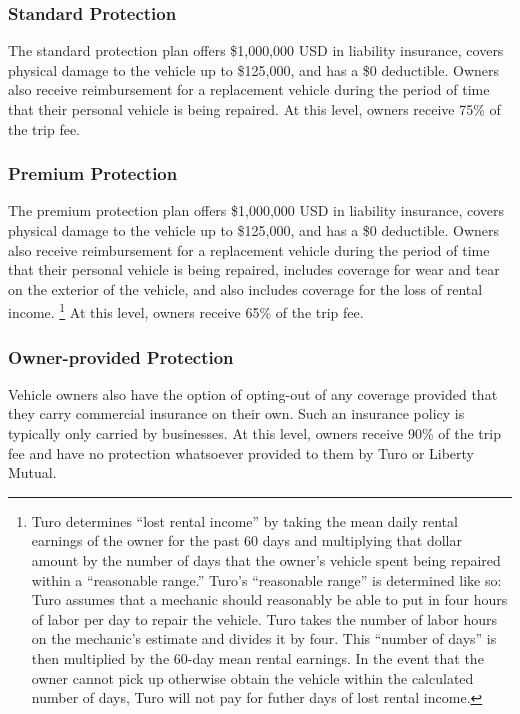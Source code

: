 \documentclass[review,12pt]{elsarticle}
\begin{document}
\subsubsection{Standard Protection}
The standard protection plan offers \$1,000,000 USD in liability insurance, covers physical damage to the vehicle up to \$125,000, and has a \$0 deductible. Owners also receive reimbursement for a replacement vehicle during the period of time that their personal vehicle is being repaired. At this level, owners receive 75\% of the trip fee.

\subsubsection{Premium Protection}\label{owner-premium-protection}
The premium protection plan offers \$1,000,000 USD in liability insurance, covers physical damage to the vehicle up to \$125,000, and has a \$0 deductible. Owners also receive reimbursement for a replacement vehicle during the period of time that their personal vehicle is being repaired, includes coverage for wear and tear on the exterior of the vehicle, and also includes coverage for the loss of rental income.
\footnote{Turo determines ``lost rental income'' by taking the mean daily rental earnings of the owner for the past 60 days and multiplying that dollar amount by the number of days that the owner's vehicle spent being repaired within a ``reasonable range.'' Turo's ``reasonable range'' is determined like so: Turo assumes that a mechanic should reasonably be able to put in four hours of labor per day to repair the vehicle. Turo takes the number of labor hours on the mechanic's estimate and divides it by four. This ``number of days'' is then multiplied by the 60-day mean rental earnings. In the event that the owner cannot pick up otherwise obtain the vehicle within the calculated number of days, Turo will not pay for futher days of lost rental income.
}
At this level, owners receive 65\% of the trip fee.

\subsubsection{Owner-provided Protection}
Vehicle owners also have the option of opting-out of any coverage provided that they carry commercial insurance on their own. Such an insurance policy is typically only carried by businesses. At this level, owners receive 90\% of the trip fee and have no protection whatsoever provided to them by Turo or Liberty Mutual.
\end{document}
